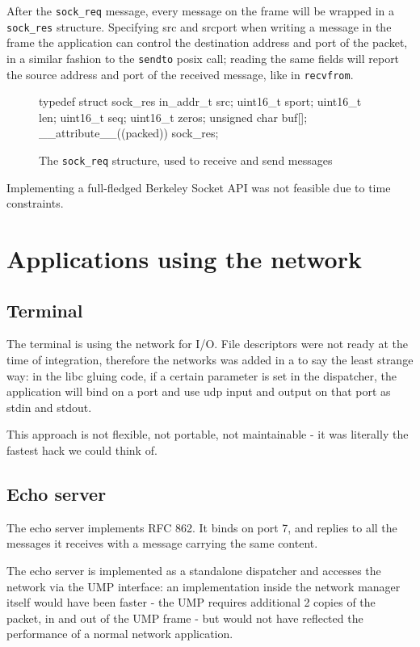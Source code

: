 \documentclass[a4paper,twoside,openright]{report}
\begin{document}
After the \texttt{sock\_req} message, every message on the frame will be wrapped in a \texttt{sock\_res} structure. Specifying src and srcport when writing a message in the frame the application can control the destination address and port of the packet, in a similar fashion to the \texttt{sendto} posix call; reading the same fields will report the source address and port of the received message, like in \texttt{recvfrom}.

\begin{figure} [H]
\begin{pandacode}
typedef struct sock_res {
	in_addr_t src;
	uint16_t sport;
	uint16_t len;
	uint16_t seq;
	uint16_t zeros;
	unsigned char buf[];
} __attribute__((packed)) sock_res;
\end{pandacode}
\caption{The \texttt{sock\_req} structure, used to receive and send messages}
\end{figure}

Implementing a full-fledged Berkeley Socket API was not feasible due to time constraints. 

\section{Applications using the network}
\subsection{Terminal}
The terminal is using the network for I/O. File descriptors were not ready at the time of integration, therefore the networks was added in a to say the least strange way: in the libc gluing code, if a certain parameter is set in the dispatcher, the application will bind on a port and use udp input and output on that port as stdin and stdout.

This approach is not flexible, not portable, not maintainable - it was literally the fastest hack we could think of.

\subsection{Echo server}
The echo server implements RFC 862. It binds on port 7, and replies to all the messages it receives with a message carrying the same content.

The echo server is implemented as a standalone dispatcher and accesses the network via the UMP interface: an implementation inside the network manager itself would have been faster - the UMP requires additional 2 copies of the packet, in and out of the UMP frame - but would not have reflected the performance of a normal network application.
\end{document}
